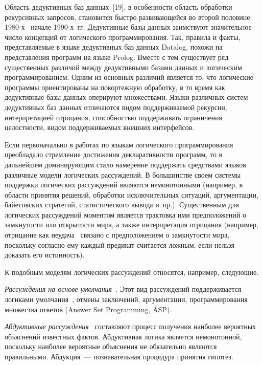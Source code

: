 \begin{multicols}{2}
Область дедуктивных баз данных~[19], в особенности область обработки рекурсивных 
запросов, становится быстро развивающейся во второй половине 1980-х\,--\,начале 
1990-х~гг. Дедуктивные базы данных заимствуют значительное число концепций от 
логического программирования. Так, правила и факты, представляемые в языке 
дедуктивных баз данных Datalog, похожи на представления программ на языке Prolog. 
Вместе с тем существует ряд существенных различий между дедуктивными базами данных 
и логическим программированием. Одним из основных различий является то, что 
логические программы ориентированы на покортежную обработку, в то время как 
дедуктивные базы данных оперируют множествами. Языки различных систем дедуктивных 
баз данных отличаются видом поддерживаемой рекурсии, интерпретацией отрицания, 
способностью поддерживать ограничения целостности, видом поддерживаемых внешних 
интерфейсов.

Если первоначально в работах по языкам логического программирования преобладало 
стремление достижения декларативности программ, то в\linebreak
дальнейшем доминирующим 
стало намерение поддержать средствами языков различные модели логических 
рассуждений. В большинстве своем систе\-мы поддержки логических рассуждений являются 
немонотонными (например, в области принятия решений, обработки исключительных 
ситуаций, аргументации, байесовских стратегий, статистического вывода и~пр.). 
Существенным для логических рассуждений моментом является трактовка ими 
предположений о замкнутости или открытости мира, а также интерпретация отрицания 
(например, отрицание как неудача~\cite{20kal, 19kal, 21kal, 22kal} связано с 
предположением о замкнутости мира, поскольку согласно ему каждый предикат считается 
ложным, если нельзя доказать его истинность). 

К подобным моделям логических рассуждений относятся, например, следующие.

\textit{Рассуждения на основе умолчания}~\cite{16kal, 17kal, 18kal}. Этот вид рассуждений 
поддерживается логиками умолчания~\cite{17kal}, отмены заключений, аргументации, 
программирования множества ответов (Answer Set Programming, ASP).

\textit{Абдуктивные рассуждения}~\cite{15kal} составляют процесс получения наиболее 
вероятных объяснений известных фактов. Абдуктивная логика является немонотонной, 
поскольку наиболее вероятные объяснения не обязательно являются правильными. 
Абдукция~--- познавательная процедура принятия гипотез.


\end{multicols}
